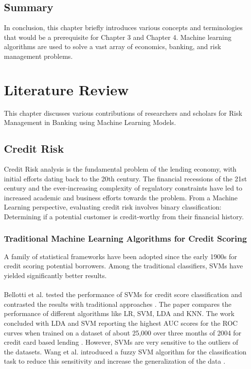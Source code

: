 \documentclass[a4paper, 12pt]{article}
\begin{document}
\vskip 0.2in
\subsection{Summary}
In conclusion, this chapter briefly introduces various concepts and terminologies that would be a prerequisite for Chapter 3 and Chapter 4. Machine learning algorithms are used to solve a vast array of economics, banking, and risk management problems.

\newpage
\section{\centering Literature Review}
\vskip 0.25in
This chapter discusses various contributions of researchers and scholars for Risk Management in Banking using Machine Learning Models.

\vskip 0.2in
\subsection{Credit Risk}
Credit Risk analysis is the fundamental problem of the lending economy, with initial efforts dating back to the 20th century. The financial recessions of the 21st century and the ever-increasing complexity of regulatory constraints have led to increased academic and business efforts towards the problem. From a Machine Learning perspective, evaluating credit risk involves binary classification: Determining if a potential customer is credit-worthy from their financial history.

\vskip 0.2in
\subsubsection{Traditional Machine Learning Algorithms for Credit Scoring}
\noindent A family of statistical frameworks have been adopted since the early 1900s for credit scoring potential borrowers. Among the traditional classifiers, SVMs have yielded significantly better results.
\\
\\
\noindent Bellotti et al. tested the performance of SVMs for credit score classification and contrasted the results with traditional approaches \cite{bellotti2009support}. The paper compares the performance of different algorithms like LR, SVM, LDA and KNN. The work concluded with LDA and SVM reporting the highest AUC scores for the ROC curves when trained on a dataset of about 25,000 over three months of 2004 for credit card based lending \cite{bellotti2009support}. However, SVMs are very sensitive to the outliers of the datasets. Wang et al. introduced a fuzzy SVM algorithm for the classification task to reduce this sensitivity and increase the generalization of the data \cite{wang2005new}.
\end{document}

